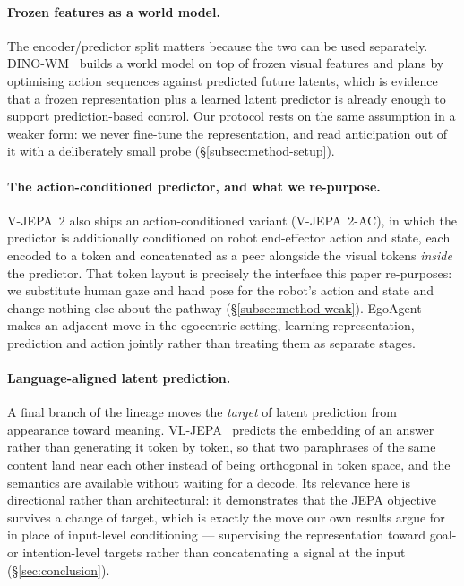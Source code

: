 \paragraph{Frozen features as a world model.}
The encoder/predictor split matters because the two can be used separately.
DINO-WM~\citep{zhou2024dinowm} builds a world model on top of frozen visual
features and plans by optimising action sequences against predicted future
latents, which is evidence that a frozen representation plus a learned latent
predictor is already enough to support prediction-based control. Our protocol
rests on the same assumption in a weaker form: we never fine-tune the
representation, and read anticipation out of it with a deliberately small probe
(\S\ref{subsec:method-setup}).

\paragraph{The action-conditioned predictor, and what we re-purpose.}
V-JEPA~2 also ships an action-conditioned variant (V-JEPA~2-AC), in which the
predictor is additionally conditioned on robot end-effector action and state,
each encoded to a token and concatenated as a peer alongside the visual tokens
\emph{inside} the predictor. That token layout is precisely the interface this
paper re-purposes: we substitute human gaze and hand pose for the robot's action
and state and change nothing else about the pathway
(\S\ref{subsec:method-weak}). EgoAgent~\citep{chen2025egoagent} makes an adjacent
move in the egocentric setting, learning representation, prediction and action
jointly rather than treating them as separate stages.

\paragraph{Language-aligned latent prediction.}
A final branch of the lineage moves the \emph{target} of latent prediction from
appearance toward meaning. VL-JEPA~\citep{vljepa2025} predicts the embedding of
an answer rather than generating it token by token, so that two paraphrases of
the same content land near each other instead of being orthogonal in token space,
and the semantics are available without waiting for a decode. Its relevance here
is directional rather than architectural: it demonstrates that the JEPA objective
survives a change of target, which is exactly the move our own results argue for
in place of input-level conditioning --- supervising the representation toward
goal- or intention-level targets rather than concatenating a signal at the input
(\S\ref{sec:conclusion}).

